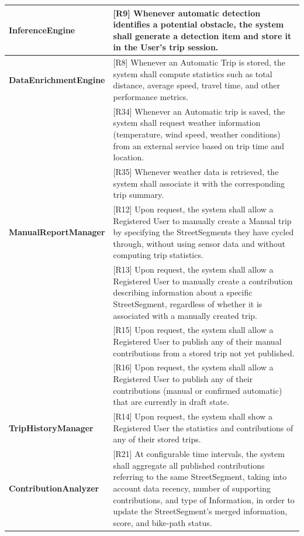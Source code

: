 \begin{center}
\begin{longtable}{p{0.30\linewidth}p{0.70\linewidth}}
\textbf{InferenceEngine} &
[R9] Whenever automatic detection identifies a potential obstacle, the system shall generate a detection item and store it in the User’s trip session. \\
\hline

\textbf{DataEnrichmentEngine} &
[R8] Whenever an Automatic Trip is stored, the system shall compute statistics such as total distance, average speed, travel time, and other performance metrics. \\
& [R34] Whenever an Automatic trip is saved, the system shall request weather information (temperature, wind speed, weather conditions) from an external service based on trip time and location. \\
& [R35] Whenever weather data is retrieved, the system shall associate it with the corresponding trip summary. \\
\hline

\textbf{ManualReportManager} &
[R12] Upon request, the system shall allow a Registered User to manually create a Manual trip by specifying the StreetSegments they have cycled through, without using sensor data and without computing trip statistics. \\
& [R13] Upon request, the system shall allow a Registered User to manually create a contribution describing information about a specific StreetSegment, regardless of whether it is associated with a manually created trip. \\
& [R15] Upon request, the system shall allow a Registered User to publish any of their manual contributions from a stored trip not yet published. \\
& [R16] Upon request, the system shall allow a Registered User to publish any of their contributions (manual or confirmed automatic) that are currently in draft state. \\
\hline

\textbf{TripHistoryManager} &
[R14] Upon request, the system shall show a Registered User the statistics and contributions of any of their stored trips. \\
\hline

\textbf{ContributionAnalyzer} &
[R21] At configurable time intervals, the system shall aggregate all published contributions
referring to the same StreetSegment, taking into account data recency, number of supporting contributions, and type of Information, in order to update the StreetSegment’s merged
information, score, and bike-path status. \\
\hline


\end{longtable}
\end{center}
